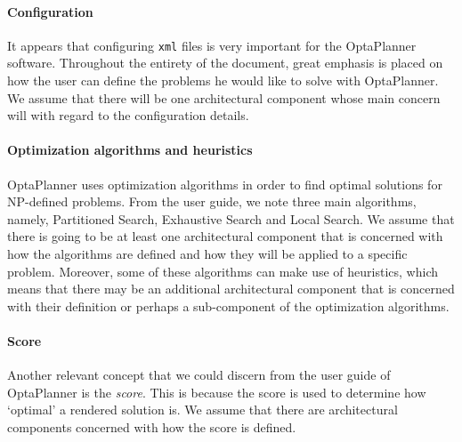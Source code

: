 \paragraph{Configuration} It appears that configuring \verb!xml! files is very important for the OptaPlanner software. Throughout the entirety of the document, great emphasis is placed on how the user can define the problems he would like to solve with OptaPlanner. We assume that there will be one architectural component whose main concern will with regard to the configuration details.
\paragraph{Optimization algorithms and heuristics} OptaPlanner uses optimization algorithms in order to find optimal solutions for NP-defined problems. From the user guide, we note three main algorithms, namely, Partitioned Search, Exhaustive Search and Local Search. We assume that there is going to be at least one architectural component that is concerned with how the algorithms are defined and how they will be applied to a specific problem. Moreover, some of these algorithms can make use of heuristics, which means that there may be an additional architectural component that is concerned with their definition or perhaps a sub-component of the optimization algorithms.
\paragraph{Score} Another relevant concept that we could discern from the user guide of OptaPlanner is the \textit{score}. This is because the score is used to determine how `optimal' a rendered solution is. We assume that there are architectural components concerned with how the score is defined. 
